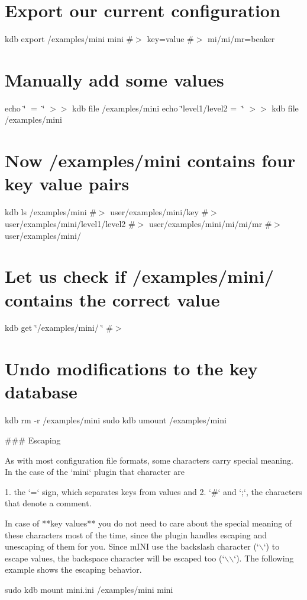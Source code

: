 \section*{Export our current configuration}

kdb export /examples/mini mini \#$>$ key=value \#$>$ mi/mi/mr=beaker

\section*{Manually add some values}

echo \char`\"{}🔑 = 🦄\char`\"{} $>$$>$ {\ttfamily kdb file /examples/mini} echo \char`\"{}level1/level2 = 👾\char`\"{} $>$$>$ {\ttfamily kdb file /examples/mini}

\section*{Now {\ttfamily /examples/mini} contains four key value pairs}

kdb ls /examples/mini \#$>$ user/examples/mini/key \#$>$ user/examples/mini/level1/level2 \#$>$ user/examples/mini/mi/mi/mr \#$>$ user/examples/mini/🔑

\section*{Let us check if {\ttfamily /examples/mini/🔑} contains the correct value}

kdb get \char`\"{}/examples/mini/🔑\char`\"{} \#$>$ 🦄

\section*{Undo modifications to the key database}

kdb rm -\/r /examples/mini sudo kdb umount /examples/mini 
\begin{DoxyCode}
### Escaping

As with most configuration file formats, some characters carry special meaning. In the case of the `mini`
       plugin that character are

1. the `=` sign, which separates keys from values and
2. `#` and `;`, the characters that denote a comment.

In case of **key values** you do not need to care about the special meaning of these characters most of the
       time, since the plugin handles escaping and unescaping of them for you. Since mINI use the backslash
       character (`\(\backslash\)`) to escape values, the backspace character will be escaped too (`\(\backslash\)\(\backslash\)`). The following example shows
       the escaping behavior.
\end{DoxyCode}
 sudo kdb mount mini.\+ini /examples/mini mini

